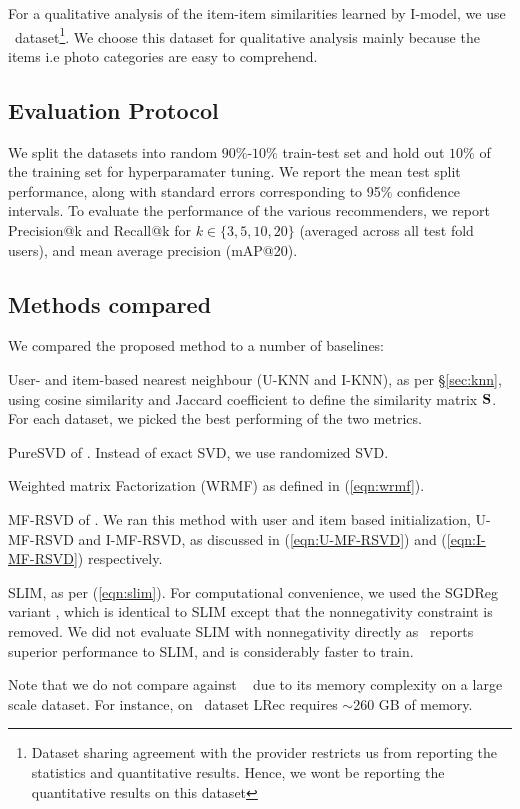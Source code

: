 For a qualitative analysis of the item-item similarities learned by I-\LinearLow model, we use \Fotolia\ dataset\footnote{\scriptsize Dataset sharing agreement with the provider restricts us from reporting the statistics and quantitative results. Hence, we wont be reporting the quantitative results on this dataset}.
We choose this dataset for qualitative analysis mainly because the items i.e photo categories are easy to comprehend.

\subsection{Evaluation Protocol}
We split the datasets into random $90\%$-$10\%$ train-test set and hold out $10\%$ of the training set for hyperparamater tuning. We report the mean test split performance, along with standard errors corresponding to 95\% confidence intervals.
To evaluate the performance of the various recommenders, we report Precision@k and Recall@k for $k \in \{ 3, 5, 10, 20 \}$ (averaged across all test fold users), and mean average precision (mAP@20).


\subsection{Methods compared}

We compared the proposed method to a number of baselines:
\begin{compactitem}

	\item User- and item-based nearest neighbour (U-KNN and I-KNN), as per \S\ref{sec:knn}, using  cosine similarity and Jaccard coefficient to define the similarity matrix $\mathbf{S}$. For each dataset, we picked the best performing of the two metrics.

	\item PureSVD of \citet{Cremonesi:2010}. Instead of exact SVD, we use randomized SVD.
	
	\item Weighted matrix Factorization (WRMF) as defined in (\ref{eqn:wrmf}).

	\item MF-RSVD of \citet{Tang:2013}.  We ran this method with user and item based initialization, U-MF-RSVD  and I-MF-RSVD, as discussed in (\ref{eqn:U-MF-RSVD}) and (\ref{eqn:I-MF-RSVD}) respectively.
	\item SLIM, as per (\ref{eqn:slim}). For computational convenience, we used the SGDReg variant \citep{Levy:2013}, which is identical to SLIM  except that the nonnegativity constraint is removed. We did not evaluate SLIM with nonnegativity directly as~\citet{Levy:2013} reports superior performance to SLIM, and is considerably faster to train.
\end{compactitem}
Note that we do not compare against ~\citep{Sedhain:2016} due to its memory complexity on a large scale dataset. For instance, on \Lowes \ dataset LRec requires $\sim$260 GB of memory. 